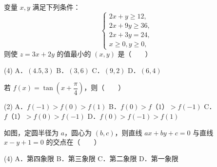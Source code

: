\begin{question}
变量 $x, y$ 满足下列条件：
\nopagebreak[4]
\[
\begin{cases}
2x + y \geqslant 12, \\
2x + 9y \geqslant 36, \\
2x + 3y = 24, \\
x \geqslant 0, y \geqslant 0,
\end{cases}
\]
则使 $z = 3x + 2y$ 的值最小的 $(x, y)$ 是\mbox{（　　）}

\begin{gkopts}(4)
\task A．$(4.5, 3)$
\task B．$(3, 6)$
\task C．$(9, 2)$
\task D．$(6, 4)$
\end{gkopts}

\end{question}
\begin{question}
若 $f(x) = \tan\left(x + \dfrac{\pi}{4}\right)$，则\mbox{（　　）}

\begin{gkopts}(2)
\task A．$f(-1) > f(0) > f(1)$
\task B．$f(0) > f（1）> f(-1)$
\task C．$f（1）> f(0) > f(-1)$
\task D．$f(0) > f(-1) > f(1)$
\end{gkopts}

\Needspace{0.4\textheight}
\end{question}
\begin{question}
如图，定圆半径为 $a$，圆心为 $(b, c)$，则直线 $ax + by + c = 0$ 与直线 $x - y + 1 = 0$ 的交点在\mbox{（　　）}
\nopagebreak[4]
\begin{center}\end{center}
\nopagebreak[4]
\begin{gkopts}(4)
\task A．第四象限
\task B．第三象限
\task C．第二象限
\task D．第一象限
\end{gkopts}

\end{question}

